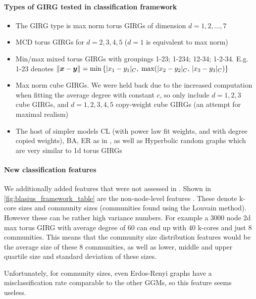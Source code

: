 \paragraph{Types of GIRG tested in classification framework}
\begin{itemize}
    \item The  GIRG type is max norm torus GIRGs of dimension $d=1,2,...,7$
    \item MCD torus GIRGs for $d=2,3,4,5$ ($d=1$ is equivalent to max norm)
    \item Min/max mixed torus GIRGs with groupings 1-23; 1-234; 12-34; 1-2-34. E.g. 1-23 denotes $\left\lVert \bm{x} - \bm{y}\right\rVert = \min \left \{ |x_1 - y_1|_C,\; \max(|x_2 - y_2|_C,\, |x_3 - y_3|_C) \right \}$
    \item Max norm cube GIRGs. We were held back due to the increased computation when fitting the average degree with constant $c$, so only include  $d=1,2,3$ cube GIRGs, and $d=1,2,3,4,5$ copy-weight cube GIRGs (an attempt for maximal realism)
    \item The host of simpler models CL (with power law fit weights, and with degree copied weights), BA, ER as in \cite{blasius2018towards}, as well as Hyperbolic random graphs which are very similar to 1d torus GIRGs
\end{itemize}

\paragraph{New classification features}
We additionally added features that were not assessed in \cite{blasius2018towards}. Shown in \cref{fig:blasius_framework_table} are the non-node-level features . These denote k-core sizes and community sizes (communities found using the Louvain method).
However these can be rather high variance numbers. For example a 3000 node 2d max torus GIRG with average degree of 60 can end up with 40 k-cores and just 8 communities. This means that the community size distribution features would be the average size of these 8 communities, as well as lower, middle and upper quartile size and standard deviation of these sizes.

Unfortunately, for community sizes, even Erdos-Renyi graphs have a misclassification rate comparable to the other GGMs, so this feature seems useless.



